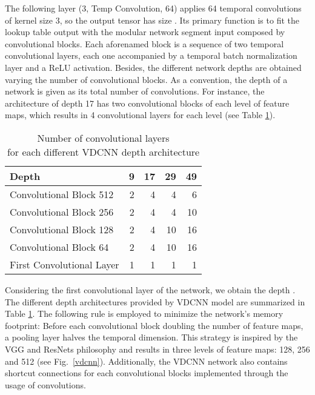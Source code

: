 \documentclass[conference]{IEEEtran}
\newcommand{\ra}[1]{\renewcommand{\arraystretch}{#1}}
\begin{document}
The following layer (3, Temp Convolution, 64) applies 64 temporal convolutions of kernel size 3, so the output tensor has size . Its primary function is to fit the lookup table output with the modular network segment input composed by convolutional blocks. Each aforenamed block is a sequence of two temporal convolutional layers,  each one accompanied by a temporal batch normalization layer \cite{ioffe2015batch} and a ReLU activation. Besides, the different network depths are obtained varying the number of convolutional blocks. As a convention,  the depth of a network is given as its total number of convolutions. For instance, the architecture of depth 17 has two convolutional blocks of each level of feature maps, which results in 4 convolutional layers for each level (see Table \ref{depth_vdcnn}).

\begin{table}[htpb]
\caption{Number of convolutional layers\\for each different VDCNN depth architecture}
\label{depth_vdcnn}
\ra{1.3}
\begin{center}
\begin{tabular}{@{}lrrrr@{}}\toprule
Depth          & 9 & 17 & 29 & 49  \\  \midrule
Convolutional Block 512 & 2 & 4 & 4 & 6 \\
Convolutional Block 256 & 2 & 4 & 4 & 10 \\
Convolutional Block 128 & 2 & 4 & 10 & 16 \\
Convolutional Block 64 & 2 & 4 & 10 & 16 \\
First Convolutional Layer & 1 & 1 & 1 & 1 \\
\bottomrule
\end{tabular}
\end{center}
\end{table}

\pagebreak

\noindent 
Considering the first convolutional layer of the network, we obtain the depth . The different depth architectures provided by VDCNN model are summarized in Table \ref{depth_vdcnn}. The following rule is employed to minimize the network's memory footprint: Before each convolutional block doubling the number of feature maps, a pooling layer halves the temporal dimension. This strategy is inspired by the VGG and ResNets philosophy and results in three levels of feature maps: 128, 256 and 512 (see Fig.~\ref{vdcnn}). Additionally, the VDCNN network also contains shortcut connections  \cite{he2016deep} for each convolutional blocks implemented through the usage of  convolutions.
\end{document}
